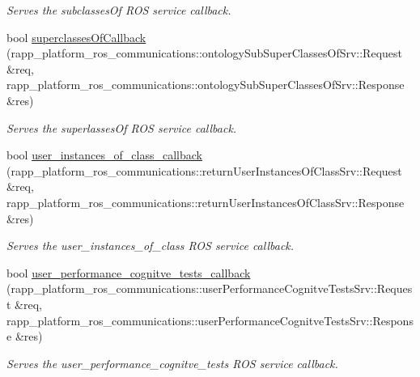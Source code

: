\begin{DoxyCompactItemize}
\begin{DoxyCompactList}\small\item\em Serves the subclasses\-Of R\-O\-S service callback. \end{DoxyCompactList}\item 
bool \hyperlink{classKnowrobWrapperCommunications_aa2f78a0238538e4c047ee7d931969219}{superclasses\-Of\-Callback} (rapp\-\_\-platform\-\_\-ros\-\_\-communications\-::ontology\-Sub\-Super\-Classes\-Of\-Srv\-::\-Request \&req, rapp\-\_\-platform\-\_\-ros\-\_\-communications\-::ontology\-Sub\-Super\-Classes\-Of\-Srv\-::\-Response \&res)
\begin{DoxyCompactList}\small\item\em Serves the superlasses\-Of R\-O\-S service callback. \end{DoxyCompactList}\item 
bool \hyperlink{classKnowrobWrapperCommunications_aa0de5d8940bd5b84b44306eb193d4adc}{user\-\_\-instances\-\_\-of\-\_\-class\-\_\-callback} (rapp\-\_\-platform\-\_\-ros\-\_\-communications\-::return\-User\-Instances\-Of\-Class\-Srv\-::\-Request \&req, rapp\-\_\-platform\-\_\-ros\-\_\-communications\-::return\-User\-Instances\-Of\-Class\-Srv\-::\-Response \&res)
\begin{DoxyCompactList}\small\item\em Serves the user\-\_\-instances\-\_\-of\-\_\-class R\-O\-S service callback. \end{DoxyCompactList}\item 
bool \hyperlink{classKnowrobWrapperCommunications_a956d4705d0234c0ed13179aff5897b30}{user\-\_\-performance\-\_\-cognitve\-\_\-tests\-\_\-callback} (rapp\-\_\-platform\-\_\-ros\-\_\-communications\-::user\-Performance\-Cognitve\-Tests\-Srv\-::\-Request \&req, rapp\-\_\-platform\-\_\-ros\-\_\-communications\-::user\-Performance\-Cognitve\-Tests\-Srv\-::\-Response \&res)
\begin{DoxyCompactList}\small\item\em Serves the user\-\_\-performance\-\_\-cognitve\-\_\-tests R\-O\-S service callback. \end{DoxyCompactList}\end{DoxyCompactItemize}
